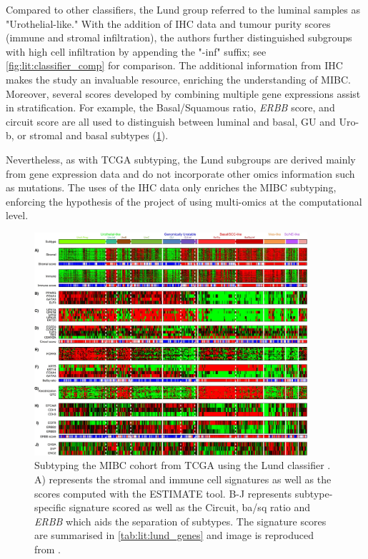 Compared to other classifiers, the Lund group referred to the luminal samples as "Urothelial-like." With the addition of IHC data and tumour purity scores (immune and stromal infiltration), the authors further distinguished subgroups with high cell infiltration by appending the "-inf" suffix; see \cref{fig:lit:classifier_comp} for comparison. The additional information from IHC makes the study an invaluable resource, enriching the understanding of MIBC. Moreover, several scores developed by combining multiple gene expressions assist in stratification. For example, the Basal/Squamous ratio, \textit{ERBB} score, and circuit score are all used to distinguish between luminal and basal, GU and Uro-b, or stromal and basal subtypes (\cref{fig:lit:lund_fig}).


Nevertheless, as with TCGA subtyping, the Lund subgroups are derived mainly from gene expression data and do not incorporate other omics information such as mutations. The uses of the IHC data only enriches the MIBC subtyping, enforcing the hypothesis of the project of using multi-omics at the computational level.

\begin{figure}[!t]   
\centering
\includegraphics[width=0.9\textwidth,height=0.9\textheight,keepaspectratio]{Sections/Lit_review/Resources/Lung_subtypes.jpg}
  \caption[Summary of MIBC subtypes using Lund classifier]{Subtyping the MIBC cohort from TCGA using the Lund classifier \citep{Marzouka2018-ge}. A) represents the stromal and immune cell signatures as well as the scores computed with the ESTIMATE tool\citep{Yoshihara2013-wq}. B-J represents subtype-specific signature scored as well as the Circuit, \acrshort{ba/sq} ratio and \textit{ERBB} which aids the separation of subtypes. The signature scores are summarised in \cref{tab:lit:lund_genes} and image is reproduced from \citep{Marzouka2018-ge}.
}
\label{fig:lit:lund_fig}
\end{figure}
\FloatBarrier


